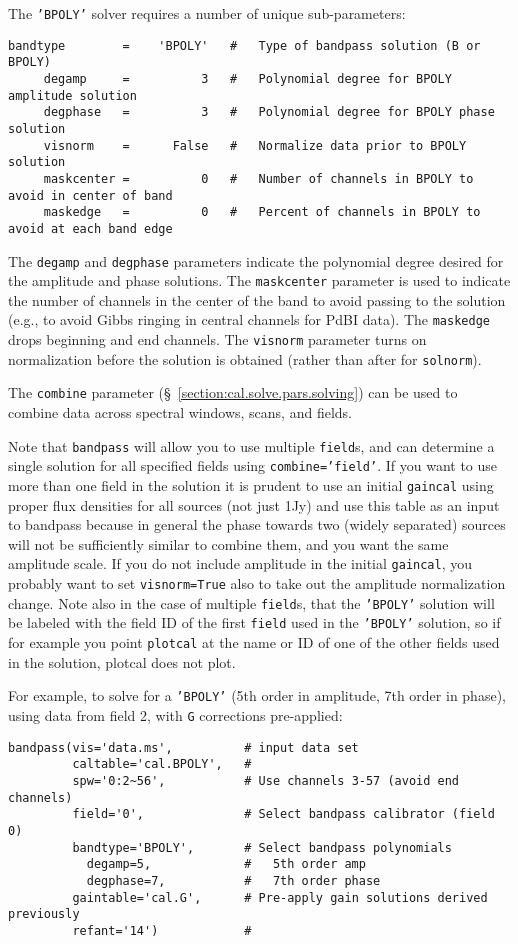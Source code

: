 The {\tt 'BPOLY'} solver requires a number of unique sub-parameters:
\small
\begin{verbatim}
bandtype        =    'BPOLY'   #   Type of bandpass solution (B or BPOLY)
     degamp     =          3   #   Polynomial degree for BPOLY amplitude solution
     degphase   =          3   #   Polynomial degree for BPOLY phase solution
     visnorm    =      False   #   Normalize data prior to BPOLY solution
     maskcenter =          0   #   Number of channels in BPOLY to avoid in center of band
     maskedge   =          0   #   Percent of channels in BPOLY to avoid at each band edge
\end{verbatim}
\normalsize
The {\tt degamp} and {\tt degphase} parameters indicate the polynomial degree
desired for the amplitude and phase solutions.  The {\tt maskcenter}
parameter is used to indicate the number of channels in the center
of the band to avoid passing to the solution (e.g., to avoid Gibbs
ringing in central channels for PdBI data).  The {\tt maskedge} drops
beginning and end channels.  The {\tt visnorm} parameter turns on
normalization before the solution is obtained (rather than after for
{\tt solnorm}).

The {\tt combine} parameter (\S~\ref{section:cal.solve.pars.solving}) 
can be used to combine data across spectral windows, scans, and
fields.

Note that {\tt bandpass} will allow you to use multiple {\tt field}s,
and can determine a single solution for all specified fields using
{\tt combine='field'}.   If you want to use more than one
field in the solution it is prudent to use an initial {\tt gaincal}
using proper flux densities for all sources (not just 1Jy)
and use this table as an input to bandpass
because in general the phase towards two (widely separated) sources
will not be sufficiently similar to combine them, and you want the
same amplitude scale.  If you do not
include amplitude in the initial {\tt gaincal}, you probably want
to set {\tt visnorm=True} also to take out the amplitude normalization
change.  Note also in 
the case of multiple {\tt field}s, that the {\tt 'BPOLY'} solution 
will be labeled with the field ID of the first {\tt field} used in
the {\tt 'BPOLY'} solution, so if for example you point {\tt plotcal} at the
name or ID of one of the other fields used in the solution, 
plotcal does not plot.

For example, to solve for a {\tt 'BPOLY'} (5th order in amplitude, 7th order
in phase), using data from field 2, with {\tt G} corrections pre-applied:
\small
\begin{verbatim}
bandpass(vis='data.ms',          # input data set
         caltable='cal.BPOLY',   #
         spw='0:2~56',           # Use channels 3-57 (avoid end channels)
         field='0',              # Select bandpass calibrator (field 0)
         bandtype='BPOLY',       # Select bandpass polynomials
           degamp=5,             #   5th order amp
           degphase=7,           #   7th order phase
         gaintable='cal.G',      # Pre-apply gain solutions derived previously
         refant='14')            #   
\end{verbatim}
\normalsize

